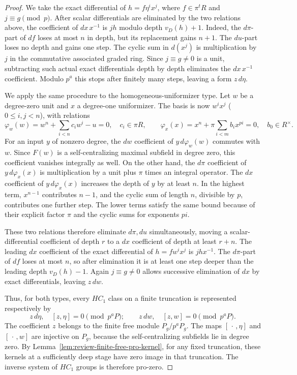 \begin{proof}
We take the exact differential of $h=f\eta^i x^j$, where $f\in\pi^tR$ and $j\equiv g\pmod p$.
After scalar differentials are eliminated by the two relations above, the coefficient of $dx\,x^{-1}$ is $j h$ modulo depth $v_D(h)+1$.
Indeed, the $d\pi$-part of $df$ loses at most $n$ in depth, but its replacement gains $n+1$.
The $du$-part loses no depth and gains one step.
The cyclic sum in $d(x^j)$ is multiplication by $j$ in the commutative associated graded ring.
Since $j\equiv g\ne0$ is a unit, subtracting such actual exact differentials depth by depth eliminates the $dx\,x^{-1}$ coefficient.
Modulo $p^a$ this stops after finitely many steps, leaving a form $z\,d\eta$.

We apply the same procedure to the homogeneous-uniformizer type.
Let $w$ be a degree-zero unit and $x$ a degree-one uniformizer.
The basis is now $w^i x^j$ ($0\le i,j<n$), with relations
\[
 \varphi_w(w)=w^n+\sum_{i<n}c_iw^i-u=0,
 \quad c_i\in\pi R,\qquad
 \varphi_x(x)=x^n+\pi\sum_{i<m}b_i x^{pi}=0,
 \quad b_0\in R^\times.
\]
For an input $y$ of nonzero degree, the $dw$ coefficient of $y\,d\varphi_w(w)$ commutes with $w$.
Since $F(w)$ is a self-centralizing maximal subfield in degree zero, this coefficient vanishes integrally as well.
On the other hand, the $d\pi$ coefficient of $y\,d\varphi_x(x)$ is multiplication by a unit plus $\pi$ times an integral operator.
The $dx$ coefficient of $y\,d\varphi_x(x)$ increases the depth of $y$ by at least $n$.
In the highest term, $x^{n-1}$ contributes $n-1$, and the cyclic sum of length $n$, divisible by $p$, contributes one further step.
The lower terms satisfy the same bound because of their explicit factor $\pi$ and the cyclic sums for exponents $pi$.

These two relations therefore eliminate $d\pi,du$ simultaneously, moving a scalar-differential coefficient of depth $r$ to a $dx$ coefficient of depth at least $r+n$.
The leading $dx$ coefficient of the exact differential of $h=fw^i x^j$ is $j h x^{-1}$.
The $d\pi$-part of $df$ loses at most $n$, so after elimination it is at least one step deeper than the leading depth $v_D(h)-1$.
Again $j\equiv g\ne0$ allows successive elimination of $dx$ by exact differentials, leaving $z\,dw$.

Thus, for both types, every $HC_1$ class on a finite truncation is represented respectively by
\[
 z\,d\eta,\quad [z,\eta]=0\pmod {p^aP};
 \qquad z\,dw,\quad [z,w]=0\pmod {p^aP}.
\]
The coefficient $z$ belongs to the finite free module $P_g/p^aP_g$.
The maps $[\,\cdot\,,\eta]$ and $[\,\cdot\,,w]$ are injective on $P_g$, because the self-centralizing subfields lie in degree zero.
By Lemma~\ref{lem:review-finite-free-pro-kernel}, for any fixed truncation, these kernels at a sufficiently deep stage have zero image in that truncation.
The inverse system of $HC_1$ groups is therefore pro-zero.


\end{proof}
